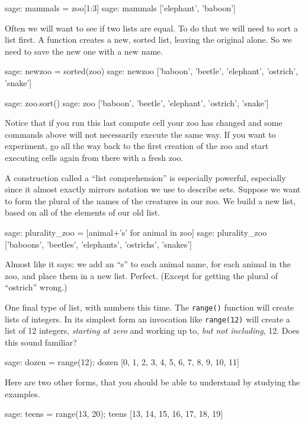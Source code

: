 %
\begin{sageexample}
sage: mammals = zoo[1:3]
sage: mammals
['elephant', 'baboon']
\end{sageexample}
%
Often we will want to see if two lists are equal.  To do that we will need to sort a list first.  A function creates a new, sorted list, leaving the original alone.  So we need to save the new one with a new name.
%
\begin{sageexample}
sage: newzoo = sorted(zoo)
sage: newzoo
['baboon', 'beetle', 'elephant', 'ostrich', 'snake']
\end{sageexample}
%
\begin{sageexample}
sage: zoo.sort()
sage: zoo
['baboon', 'beetle', 'elephant', 'ostrich', 'snake']
\end{sageexample}
%
Notice that if you run this last compute cell your zoo has changed and some commands above will not necessarily execute the same way.  If you want to experiment, go all the way back to the first creation of the zoo and start executing cells again from there with a fresh zoo.\par
%
A construction called a ``list comprehension'' is especially powerful, especially since it almost exactly mirrors notation we use to describe sets.  Suppose we want to form the plural of the names of the creatures in our zoo.  We build a new list, based on all of the elements of our old list.
%
\begin{sageexample}
sage: plurality_zoo = [animal+'s' for animal in zoo]
sage: plurality_zoo
['baboons', 'beetles', 'elephants', 'ostrichs', 'snakes']
\end{sageexample}
%
Almost like it says: we add an ``s'' to each animal name, for each animal in the zoo, and place them in a new list.  Perfect.  (Except for getting the plural of ``ostrich'' wrong.)\par
%
%
One final type of list, with numbers this time.  The \verb?range()? function will create lists of integers.  In its simplest form an invocation like \verb?range(12)? will create a list of 12 integers, \emph{starting at zero} and working up to, \emph{but not including}, 12.  Does this sound familiar?
%
\begin{sageexample}
sage: dozen = range(12); dozen
[0, 1, 2, 3, 4, 5, 6, 7, 8, 9, 10, 11]
\end{sageexample}
%
Here are two other forms, that you should be able to understand by studying the examples.
%
\begin{sageexample}
sage: teens = range(13, 20); teens
[13, 14, 15, 16, 17, 18, 19]
\end{sageexample}
